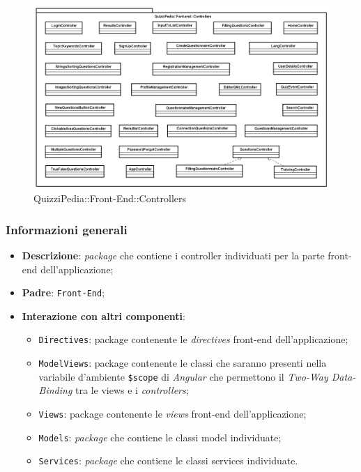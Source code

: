 \begin{figure} [ht]
	\centering
	\includegraphics[scale=0.42]{UML/Package/QuizziPedia_Front-End_Controllers.png}
	\caption{QuizziPedia::Front-End::Controllers}
\end{figure} \FloatBarrier

\subsubsection{Informazioni generali}
\begin{itemize}
	\item \textbf{Descrizione}: \textit{package} che contiene i controller individuati per la parte front-end dell'applicazione;
	\item \textbf{Padre}: \texttt{Front-End};
	\item \textbf{Interazione con altri componenti}:
	\begin{itemize}
		\item \texttt{Directives}: package contenente le \textit{directives} front-end dell'applicazione;
		\item \texttt{ModelViews}: package contenente le classi che saranno presenti nella variabile d'ambiente \texttt{\$scope} di \textit{Angular} che permettono il \textit{Two-Way Data-Binding} tra le views e i \textit{controllers};
		\item \texttt{Views}: package contenente le \textit{views} front-end dell'applicazione;
		\item \texttt{Models}: \textit{package} che contiene le classi model individuate;
		\item \texttt{Services}: \textit{package} che contiene le classi services individuate.
	\end{itemize} 
\end{itemize}
